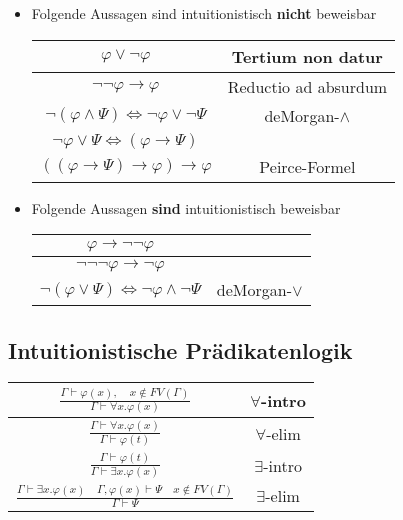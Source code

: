 \documentclass{scrartcl}
\begin{document}
\begin{itemize}
	\item Folgende Aussagen sind intuitionistisch \textbf{nicht} beweisbar \\
	\LARGE
	\begin{tabular}{|c|c|}
		\hline 
		$ \varphi \vee \neg \varphi $ & Tertium non datur \\ 
		\hline 
		$ \neg \neg \varphi \rightarrow \varphi $ & Reductio ad absurdum \\ 
		\hline 
		$ \neg (\varphi \wedge \varPsi) \iff \neg \varphi \vee \neg \varPsi $ & deMorgan-$ \wedge $ \\ 
		\hline 
		$ \neg \varphi \vee \varPsi \iff (\varphi \rightarrow \varPsi) $ &  \\ 
		\hline 
		$ ((\varphi \rightarrow \varPsi) \rightarrow \varphi) \rightarrow \varphi $ & Peirce-Formel \\ 
		\hline 
	\end{tabular} 
	\normalsize
	\item Folgende Aussagen \textbf{sind} intuitionistisch beweisbar \\
	\LARGE
	\begin{tabular}{|c|c|}
		\hline 
		$ \varphi \rightarrow \neg \neg \varphi $ &  \\ 
		\hline 
		$ \neg \neg \neg \varphi \rightarrow \neg \varphi $ &  \\ 
		\hline 
		$ \neg(\varphi \vee \varPsi) \iff \neg \varphi \wedge \neg \varPsi $ & deMorgan-$ \vee $ \\ 
		\hline 
	\end{tabular} 
\end{itemize}

\subsection{Intuitionistische Prädikatenlogik}

\Huge
\begin{tabular}{|c|c|}
	\hline 
	$ \frac{\Gamma \vdash \varphi(x), \quad x \not \in FV(\Gamma)}{\Gamma \vdash \forall x.\varphi(x)} $ & $ \forall $-intro \\ 
	\hline 
	$ \frac{\Gamma \vdash \forall x.\varphi(x)}{\Gamma \vdash \varphi(t)} $ & $ \forall $-elim \\ 
	\hline 
	$ \frac{\Gamma \vdash \varphi(t)}{\Gamma \vdash \exists x.\varphi(x)} $ & $ \exists $-intro \\
	\hline
	$ \frac{\Gamma \vdash \exists x.\varphi(x) \quad \Gamma, \varphi(x) \vdash \varPsi \quad x \not \in FV(\Gamma)}{\Gamma \vdash \varPsi} $ & $ \exists $-elim \\
	\hline
\end{tabular} 
\end{document}
